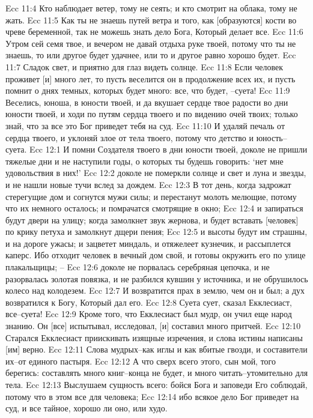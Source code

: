 Ecc 11:4  Кто наблюдает ветер, тому не сеять; и кто смотрит на облака, тому не жать.
Ecc 11:5  Как ты не знаешь путей ветра и того, как [образуются] кости во чреве беременной, так не можешь знать дело Бога, Который делает все.
Ecc 11:6  Утром сей семя твое, и вечером не давай отдыха руке твоей, потому что ты не знаешь, то или другое будет удачнее, или то и другое равно хорошо будет.
Ecc 11:7  Сладок свет, и приятно для глаз видеть солнце.
Ecc 11:8  Если человек проживет [и] много лет, то пусть веселится он в продолжение всех их, и пусть помнит о днях темных, которых будет много: все, что будет, --суета!
Ecc 11:9  Веселись, юноша, в юности твоей, и да вкушает сердце твое радости во дни юности твоей, и ходи по путям сердца твоего и по видению очей твоих; только знай, что за все это Бог приведет тебя на суд.
Ecc 11:10  И удаляй печаль от сердца твоего, и уклоняй злое от тела твоего, потому что детство и юность--суета.
Ecc 12:1  И помни Создателя твоего в дни юности твоей, доколе не пришли тяжелые дни и не наступили годы, о которых ты будешь говорить: `нет мне удовольствия в них!'
Ecc 12:2  доколе не померкли солнце и свет и луна и звезды, и не нашли новые тучи вслед за дождем.
Ecc 12:3  В тот день, когда задрожат стерегущие дом и согнутся мужи силы; и перестанут молоть мелющие, потому что их немного осталось; и помрачатся смотрящие в окно;
Ecc 12:4  и запираться будут двери на улицу; когда замолкнет звук жернова, и будет вставать [человек] по крику петуха и замолкнут дщери пения;
Ecc 12:5  и высоты будут им страшны, и на дороге ужасы; и зацветет миндаль, и отяжелеет кузнечик, и рассыплется каперс. Ибо отходит человек в вечный дом свой, и готовы окружить его по улице плакальщицы; --
Ecc 12:6  доколе не порвалась серебряная цепочка, и не разорвалась золотая повязка, и не разбился кувшин у источника, и не обрушилось колесо над колодезем.
Ecc 12:7  И возвратится прах в землю, чем он и был; а дух возвратился к Богу, Который дал его.
Ecc 12:8  Суета сует, сказал Екклесиаст, все--суета!
Ecc 12:9  Кроме того, что Екклесиаст был мудр, он учил еще народ знанию. Он [все] испытывал, исследовал, [и] составил много притчей.
Ecc 12:10  Старался Екклесиаст приискивать изящные изречения, и слова истины написаны [им] верно.
Ecc 12:11  Слова мудрых--как иглы и как вбитые гвозди, и составители их--от единого пастыря.
Ecc 12:12  А что сверх всего этого, сын мой, того берегись: составлять много книг--конца не будет, и много читать--утомительно для тела.
Ecc 12:13  Выслушаем сущность всего: бойся Бога и заповеди Его соблюдай, потому что в этом все для человека;
Ecc 12:14  ибо всякое дело Бог приведет на суд, и все тайное, хорошо ли оно, или худо.


